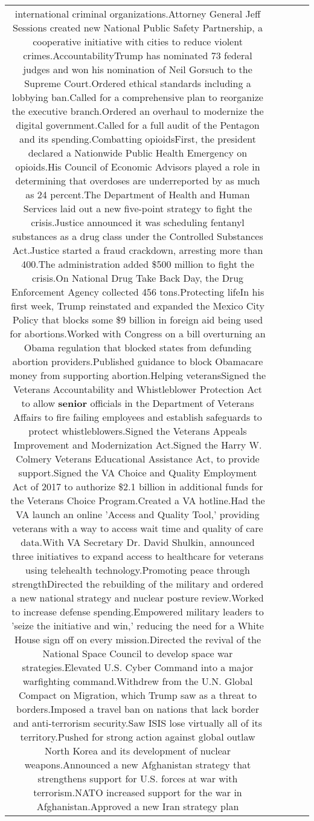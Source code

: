 \documentclass[11pt]{article}
\newlength\mylength
\begin{document}
\begin{center}
\begin{longtable}{|C{.65\mylength}|C{.30\mylength}|C{.12\mylength}|C{.12\mylength}|C{.12\mylength}|}
international criminal organizations.Attorney General Jeff Sessions created new National Public Safety Partnership, a cooperative initiative with cities to reduce violent crimes.AccountabilityTrump has nominated 73 federal judges and won his nomination of Neil Gorsuch to the Supreme Court.Ordered ethical standards including a lobbying ban.Called for a comprehensive plan to reorganize the executive branch.Ordered an overhaul to modernize the digital government.Called for a full audit of the Pentagon and its spending.Combatting opioidsFirst, the president declared a Nationwide Public Health Emergency on opioids.His Council of Economic Advisors played a role in determining that overdoses are underreported by as much as 24 percent.The Department of Health and Human Services laid out a new five-point strategy to fight the crisis.Justice announced it was scheduling fentanyl substances as a drug class under the Controlled Substances Act.Justice started a fraud crackdown, arresting more than 400.The administration added \$500 million to fight the crisis.On National Drug Take Back Day, the Drug Enforcement Agency collected 456 tons.Protecting lifeIn his first week, Trump reinstated and expanded the Mexico City Policy that blocks some \$9 billion in foreign aid being used for abortions.Worked with Congress on a bill overturning an Obama regulation that blocked states from defunding abortion providers.Published guidance to block Obamacare money from supporting abortion.Helping veteransSigned the Veterans Accountability and Whistleblower Protection Act to allow \textbf{senior} officials in the Department of Veterans Affairs to fire failing employees and establish safeguards to protect whistleblowers.Signed the Veterans Appeals Improvement and Modernization Act.Signed the Harry W. Colmery Veterans Educational Assistance Act, to provide support.Signed the VA Choice and Quality Employment Act of 2017 to authorize \$2.1 billion in additional funds for the Veterans Choice Program.Created a VA hotline.Had the VA launch an online 'Access and Quality Tool,' providing veterans with a way to access wait time and quality of care data.With VA Secretary Dr. David Shulkin, announced three initiatives to expand access to healthcare for veterans using telehealth technology.Promoting peace through strengthDirected the rebuilding of the military and ordered a new national strategy and nuclear posture review.Worked to increase defense spending.Empowered military leaders to 'seize the initiative and win,' reducing the need for a White House sign off on every mission.Directed the revival of the National Space Council to develop space war strategies.Elevated U.S. Cyber Command into a major warfighting command.Withdrew from the U.N. Global Compact on Migration, which Trump saw as a threat to borders.Imposed a travel ban on nations that lack border and anti-terrorism security.Saw ISIS lose virtually all of its territory.Pushed for strong action against global outlaw North Korea and its development of nuclear weapons.Announced a new Afghanistan strategy that strengthens support for U.S. forces at war with terrorism.NATO increased support for the war in Afghanistan.Approved a new Iran strategy plan 
\end{longtable}
\end{center}
\end{document}

